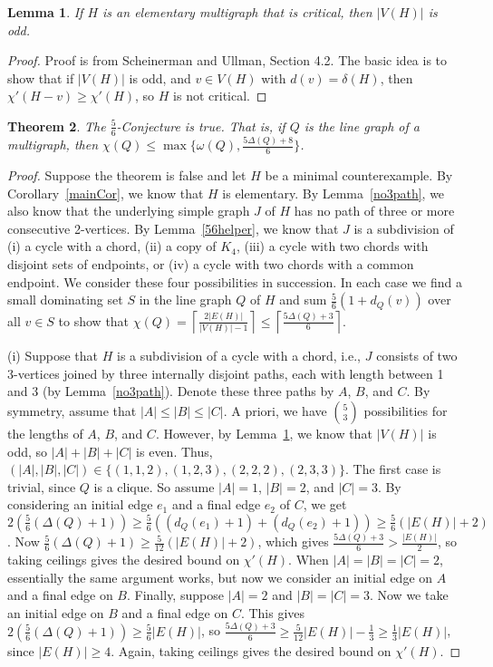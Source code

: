 \documentclass[12pt]{amsart}
\theoremstyle{plain}
\newtheorem{thm}{Theorem}
\newtheorem{lem}[thm]{Lemma}
\theoremstyle{definition}
\theoremstyle{remark}
\newcommand{\ceil}[1]{\left\lceil#1\right\rceil}
\begin{document}
\begin{lem}
If $H$ is an elementary multigraph that is critical, then $|V(H)|$ is odd.
\label{elem-odd}
\end{lem}
\begin{proof}
Proof is from Scheinerman and Ullman, Section 4.2.  The basic idea is to show
that if $|V(H)|$ is odd, and $v\in V(H)$ with $d(v)=\delta(H)$, then
$\chi'(H-v)\ge \chi'(H)$, so $H$ is not critical.
\end{proof}

\begin{thm}
The $\frac56$-Conjecture is true.  That is, if $Q$ is the line graph of a
multigraph, then $\chi(Q)\le \max\{\omega(Q),\frac{5\Delta(Q)+8}6\}$.
\end{thm}
\begin{proof}
Suppose the theorem is false and let $H$ be a minimal counterexample.  By
Corollary~\ref{mainCor}, we know that $H$ is elementary.  By
Lemma~\ref{no3path}, we also know that the underlying simple graph $J$ of $H$
has no path of three or more consecutive 2-vertices.
By Lemma~\ref{56helper}, we know that $J$ is a subdivision of 
(i) a cycle with a chord, (ii) a copy of $K_4$, (iii) a cycle with two chords
with disjoint sets of endpoints, or (iv) a cycle with two chords with a common
endpoint.  We consider these four possibilities in succession.  In each case we
find a small dominating set $S$ in the line graph $Q$ of $H$ and sum
$\frac56(1+d_Q(v))$ over all $v\in S$ to show that
$\chi(Q)=\ceil{\frac{2|E(H)|}{|V(H)|-1}}\le \ceil{\frac{5\Delta(Q)+3}6}$.

(i) Suppose that $H$ is a subdivision of a cycle with a chord, i.e., $J$
consists of two 3-vertices joined by three internally disjoint paths, each
with length between 1 and 3 (by Lemma~\ref{no3path}).  
Denote these three paths by $A$, $B$, and $C$.  By
symmetry, assume that $|A|\le |B|\le |C|$.  A priori, we have ${5\choose 3}$
possibilities for the lengths of $A$, $B$, and $C$.  However, by
Lemma~\ref{elem-odd}, we know that $|V(H)|$ is odd, so $|A|+|B|+|C|$ is even.  
Thus, $(|A|,|B|,|C|)\in\{(1,1,2),(1,2,3),(2,2,2),(2,3,3)\}$.
The first case is trivial, since $Q$ is a clique.  So assume $|A|=1$, $|B|=2$,
and $|C|=3$.  By considering an initial edge $e_1$ and a final edge $e_2$ of
$C$, we get $2(\frac56(\Delta(Q)+1))\ge
\frac56((d_Q(e_1)+1)+(d_Q(e_2)+1))\ge\frac56(|E(H)|+2)$. Now
$\frac56(\Delta(Q)+1)\ge\frac5{12}(|E(H)|+2)$, which gives
$\frac{5\Delta(Q)+3}6>\frac{|E(H)|}2$, so taking ceilings gives the desired
bound on $\chi'(H)$.  When $|A|=|B|=|C|=2$, essentially the same argument works,
but now we consider an initial edge on $A$ and a final edge on $B$.
Finally, suppose $|A|=2$ and $|B|=|C|=3$.  Now we take an initial edge on $B$
and a final edge on $C$.  This gives $2(\frac56(\Delta(Q)+1))\ge\frac56|E(H)|$, so
$\frac{5\Delta(Q)+3}6\ge\frac5{12}|E(H)|-\frac13\ge\frac13|E(H)|$, since
$|E(H)|\ge 4$.  Again, taking ceilings gives the desired bound on $\chi'(H)$.



\end{proof}
\end{document}
